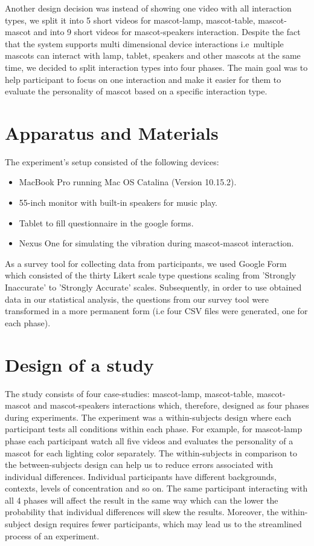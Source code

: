 Another design decision was instead of showing one video with all interaction types,
we split it into 5 short videos for mascot-lamp, mascot-table, mascot-mascot
and into 9 short videos for mascot-speakers interaction.
Despite the fact that the system supports multi dimensional device interactions
i.e\ multiple mascots can interact with lamp, tablet, speakers and other mascots at the same time,
we decided to split interaction types into four phases.
The main goal was to help participant to focus on one interaction and make
it easier for them to evaluate the personality of mascot based on a specific interaction type.

\section{Apparatus and Materials}
\label{sec:apparatus-and-materials}
The experiment’s setup consisted of the following devices:
\begin{itemize}
  \item MacBook Pro running Mac OS Catalina (Version 10.15.2).
  \item 55-inch monitor with built-in speakers for music play.
  \item Tablet to fill questionnaire in the google forms.
  \item Nexus One for simulating the vibration during mascot-mascot interaction.
\end{itemize}

As a survey tool for collecting data from participants, we used Google Form which consisted
of the thirty Likert scale type questions scaling from 'Strongly Inaccurate' to 'Strongly Accurate' scales.
Subsequently, in order to use obtained data in our statistical analysis, the questions
from our survey tool were transformed in a more permanent form (i.e four CSV files were generated, one for each phase).

\section{Design of a study}
\label{sec:design-of-a-study}

The study consists of four case-studies: mascot-lamp, mascot-table, mascot-mascot and mascot-speakers
interactions which, therefore, designed as four phases during experiments.
The experiment was a within-subjects design where each participant tests all conditions within each phase.
For example, for mascot-lamp phase each participant watch all five videos and
evaluates the personality of a mascot for each lighting color separately.
The within-subjects in comparison to the between-subjects design can help us to
reduce errors associated with individual differences.
Individual participants have different backgrounds, contexts, levels of concentration and so on.
The same participant interacting with all 4 phases will affect the result in the same way
which can the lower the probability that individual differences will skew the results.
Moreover, the within-subject design requires fewer participants, which may lead
us to the streamlined process of an experiment.

